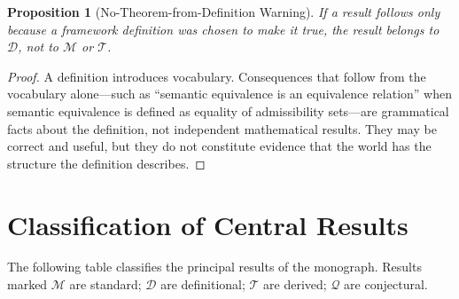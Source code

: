 \documentclass[12pt, oneside]{book}
\theoremstyle{flyxion}
\newtheorem{proposition}[theorem]{Proposition}
\theoremstyle{definition}
\begin{document}
\begin{proposition}[No-Theorem-from-Definition Warning]
If a result follows only because a framework definition
was chosen to make it true, the result belongs to
$\mathcal{D}$, not to $\mathcal{M}$ or $\mathcal{T}$.
\end{proposition}

\begin{proof}
A definition introduces vocabulary. Consequences that
follow from the vocabulary alone---such as ``semantic
equivalence is an equivalence relation'' when semantic
equivalence is defined as equality of admissibility
sets---are grammatical facts about the definition,
not independent mathematical results. They may be
correct and useful, but they do not constitute evidence
that the world has the structure the definition
describes.
\end{proof}

\section{Classification of Central Results}

The following table classifies the principal results
of the monograph. Results marked $\mathcal{M}$ are
standard; $\mathcal{D}$ are definitional; $\mathcal{T}$
are derived; $\mathcal{Q}$ are conjectural.
\end{document}
